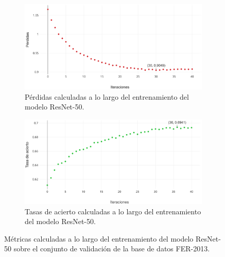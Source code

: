 
\begin{figure}
   \vspace{1cm}
    \begin{subfigure}[t]{\textwidth}
      \centering
      \includegraphics[width=\linewidth]{Images/ResNet-50_loss.png}
      \caption{Pérdidas calculadas a lo largo del entrenamiento del modelo ResNet-50.}
      \label{fig:ResNet-50_loss}
    \end{subfigure}
    
    \vspace{1cm}
    \begin{subfigure}[t]{\textwidth}
      \centering
      \includegraphics[width=\linewidth]{Images/ResNet-50_acc.png}
      \caption{Tasas de acierto calculadas a lo largo del entrenamiento del modelo ResNet-50.}
      \label{fig:ResNet-50_acc}
    \end{subfigure}
    \caption{Métricas calculadas a lo largo del entrenamiento del modelo ResNet-50 sobre el conjunto de validación de la base de datos FER-2013.}
    \label{fig:ResNet-50_metrics}
\end{figure}

